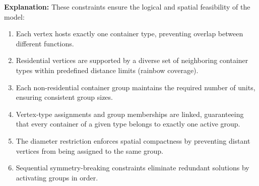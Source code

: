 \documentclass[12pt,a4paper]{article}
\begin{document}
\textbf{Explanation:}  
These constraints ensure the logical and spatial feasibility of the model:
\begin{enumerate}
    \item Each vertex hosts exactly one container type, preventing overlap between different functions.
    \item Residential vertices are supported by a diverse set of neighboring container types within predefined distance limits (rainbow coverage).
    \item Each non-residential container group maintains the required number of units, ensuring consistent group sizes.
    \item Vertex-type assignments and group memberships are linked, guaranteeing that every container of a given type belongs to exactly one active group.
    \item The diameter restriction enforces spatial compactness by preventing distant vertices from being assigned to the same group.
    \item Sequential symmetry-breaking constraints eliminate redundant solutions by activating groups in order.
\end{enumerate}
\end{document}

